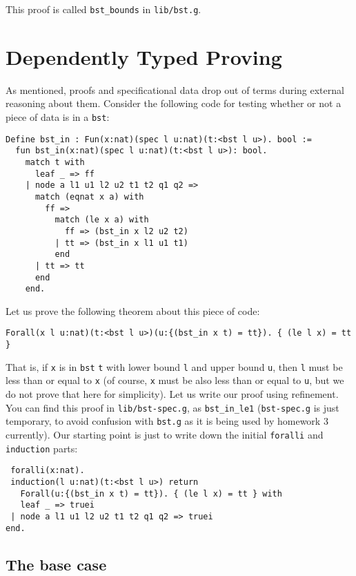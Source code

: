\documentclass{book}[12pt]
\begin{document}
\noindent This proof is called \texttt{bst\_bounds} in \texttt{lib/bst.g}.

\section{Dependently Typed Proving}

As mentioned, proofs and specificational data drop out of terms during
external reasoning about them.  Consider the following code for testing
whether or not a piece of data is in a \texttt{bst}:

\begin{verbatim}
Define bst_in : Fun(x:nat)(spec l u:nat)(t:<bst l u>). bool :=
  fun bst_in(x:nat)(spec l u:nat)(t:<bst l u>): bool.
    match t with
      leaf _ => ff
    | node a l1 u1 l2 u2 t1 t2 q1 q2 =>
      match (eqnat x a) with
        ff => 
          match (le x a) with
            ff => (bst_in x l2 u2 t2)
          | tt => (bst_in x l1 u1 t1)
          end
      | tt => tt
      end
    end.
\end{verbatim}

\noindent Let us prove the following theorem about this piece of code:

\begin{verbatim}
Forall(x l u:nat)(t:<bst l u>)(u:{(bst_in x t) = tt}). { (le l x) = tt }
\end{verbatim}

\noindent That is, if \texttt{x} is in \texttt{bst} \texttt{t} with
lower bound \texttt{l} and upper bound \texttt{u}, then \texttt{l}
must be less than or equal to \texttt{x} (of course, \texttt{x} must
be also less than or equal to \texttt{u}, but we do not prove that
here for simplicity).  Let us write our proof using refinement.  You
can find this proof in \texttt{lib/bst-spec.g}, as
\texttt{bst\_in\_le1} (\texttt{bst-spec.g} is just temporary, to avoid
confusion with \texttt{bst.g} as it is being used by homework 3
currently).  Our starting point is just to write down the initial
\texttt{foralli} and \texttt{induction} parts:

\begin{verbatim}
 foralli(x:nat).
 induction(l u:nat)(t:<bst l u>) return
   Forall(u:{(bst_in x t) = tt}). { (le l x) = tt } with
   leaf _ => truei
 | node a l1 u1 l2 u2 t1 t2 q1 q2 => truei
end.
\end{verbatim}

\subsection{The base case}
\end{document}

